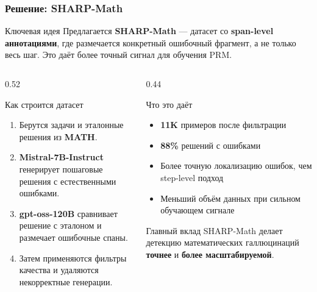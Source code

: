 \documentclass{beamer}
\begin{document}
\begin{frame}
  \frametitle{Решение: SHARP-Math}
  \scriptsize

  \begin{block}{Ключевая идея}
      Предлагается \textbf{SHARP-Math} --- датасет со \textbf{span-level аннотациями}, где размечается конкретный ошибочный фрагмент, а не только весь шаг. Это даёт более точный сигнал для обучения PRM.
  \end{block}

  \begin{columns}[T]
      \begin{column}{0.52\textwidth}
          \begin{block}{Как строится датасет}
              \begin{enumerate}
                  \item Берутся задачи и эталонные решения из \textbf{MATH}.
                  \item \textbf{Mistral-7B-Instruct} генерирует пошаговые решения с естественными ошибками.
                  \item \textbf{gpt-oss-120B} сравнивает решение с эталоном и размечает ошибочные спаны.
                  \item Затем применяются фильтры качества и удаляются некорректные генерации.
              \end{enumerate}
          \end{block}
      \end{column}
      \begin{column}{0.44\textwidth}
          \begin{block}{Что это даёт}
              \begin{itemize}
                  \item \textbf{11K} примеров после фильтрации
                  \item \textbf{88\%} решений с ошибками
                  \item Более точную локализацию ошибок, чем step-level подход
                  \item Меньший объём данных при сильном обучающем сигнале
              \end{itemize}
          \end{block}
          \begin{alertblock}{Главный вклад}
              SHARP-Math делает детекцию математических галлюцинаций \textbf{точнее} и \textbf{более масштабируемой}.
          \end{alertblock}
      \end{column}
  \end{columns}
\end{frame}
\end{document}
